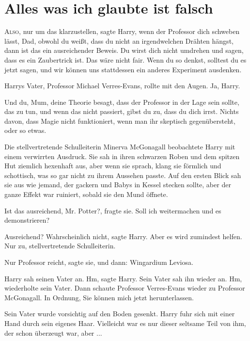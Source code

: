 \chapter{Alles was ich glaubte ist falsch}

\lettrine{\loq A}{lso}, nur um das klarzustellen\grqq{}, sagte Harry, \glqq wenn
der Professor dich schweben lässt, Dad, obwohl du weißt, dass du nicht an
irgendwelchen Drähten hängst, dann ist das ein ausreichender Beweis. Du wirst
dich nicht umdrehen und sagen, dass es ein Zaubertrick ist. Das wäre nicht
fair. Wenn du so denkst, solltest du es jetzt sagen, und wir können uns
stattdessen ein anderes Experiment ausdenken.\grqq{}

Harrys Vater, Professor Michael Verres-Evans, rollte mit den Augen. \glqq{}Ja,
Harry.\grqq{}

\glqq{}Und du, Mum, deine Theorie besagt, dass der Professor in der Lage sein
sollte, das zu tun, und wenn das nicht passiert, gibst du zu, dass du dich
irrst. Nichts davon, dass Magie nicht funktioniert, wenn man ihr skeptisch
gegenübersteht, oder so etwas.\grqq{}

Die stellvertretende Schulleiterin Minerva McGonagall beobachtete Harry mit
einem verwirrten Ausdruck. Sie sah in ihren schwarzen Roben und dem spitzen Hut
ziemlich hexenhaft aus, aber wenn sie sprach, klang sie förmlich und schottisch,
was so gar nicht zu ihrem Aussehen passte. Auf den ersten Blick sah sie aus wie
jemand, der gackern und Babys in Kessel stecken sollte, aber der ganze Effekt
war ruiniert, sobald sie den Mund öffnete.

\glqq{}Ist das ausreichend, Mr. Potter?\grqq{}, fragte sie. \glqq{}Soll ich
weitermachen und es demonstrieren?\grqq{}

\glqq{}Ausreichend? Wahrscheinlich nicht\grqq{}, sagte Harry. \glqq{}Aber es
wird zumindest helfen. Nur zu, stellvertretende Schulleiterin.\grqq{}

\glqq{}Nur Professor reicht\grqq{}, sagte sie, und dann: \glqq{}Wingardium
Leviosa.\grqq{}

Harry sah seinen Vater an. \glqq{}Hm\grqq{}, sagte Harry. Sein Vater sah ihn
wieder an. \glqq{}Hm\grqq{}, wiederholte sein Vater. Dann schaute Professor
Verres-Evans wieder zu Professor McGonagall. \glqq{}In Ordnung, Sie können mich
jetzt herunterlassen.\grqq{}

Sein Vater wurde vorsichtig auf den Boden gesenkt. Harry fuhr sich mit einer
Hand durch sein eigenes Haar. Vielleicht war es nur dieser seltsame Teil von
ihm, der schon überzeugt war, aber ...

